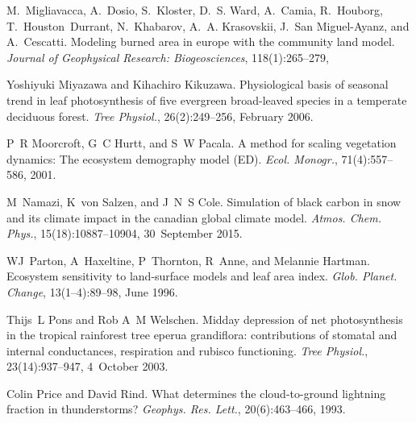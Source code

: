 \begin{DoxyDescription}
\item[\label{_CITEREF_Migliavacca2013-eh}%
\mbox{[}40\mbox{]}]M.~Migliavacca, A.~Dosio, S.~Kloster, D.~S. Ward, A.~Camia, R.~Houborg, T.~Houston~Durrant, N.~Khabarov, A.~A. Krasovskii, J.~San Miguel-\/\+Ayanz, and A.~Cescatti. Modeling burned area in europe with the community land model. {\itshape Journal of Geophysical Research\+: Biogeosciences}, 118(1)\+:265--279,
\begin{DoxyEnumerate}
\item 
\end{DoxyEnumerate}


\item[\label{_CITEREF_Miyazawa2006-so}%
\mbox{[}41\mbox{]}]Yoshiyuki Miyazawa and Kihachiro Kikuzawa. Physiological basis of seasonal trend in leaf photosynthesis of five evergreen broad-\/leaved species in a temperate deciduous forest. {\itshape Tree Physiol.}, 26(2)\+:249--256, February 2006.


\item[\label{_CITEREF_Moorcroft2001-co}%
\mbox{[}42\mbox{]}]P~R Moorcroft, G~C Hurtt, and S~W Pacala. A method for scaling vegetation dynamics\+: The ecosystem demography model (E\+D). {\itshape Ecol. Monogr.}, 71(4)\+:557--586, 2001. 


\item[\label{_CITEREF_Namazi2015-wz}%
\mbox{[}43\mbox{]}]M~Namazi, K~von Salzen, and J~N~S Cole. Simulation of black carbon in snow and its climate impact in the canadian global climate model. {\itshape Atmos. Chem. Phys.}, 15(18)\+:10887--10904, 30~September 2015. 


\item[\label{_CITEREF_Parton1996-zv}%
\mbox{[}44\mbox{]}]W\+J~Parton, A~Haxeltine, P~Thornton, R~Anne, and Melannie Hartman. Ecosystem sensitivity to land-\/surface models and leaf area index. {\itshape Glob. Planet. Change}, 13(1–4)\+:89--98, June 1996. 


\item[\label{_CITEREF_Pons2003-f26}%
\mbox{[}45\mbox{]}]Thijs~L Pons and Rob A~M Welschen. Midday depression of net photosynthesis in the tropical rainforest tree eperua grandiflora\+: contributions of stomatal and internal conductances, respiration and rubisco functioning. {\itshape Tree Physiol.}, 23(14)\+:937--947, 4~October 2003.


\item[\label{_CITEREF_Price1993-fm}%
\mbox{[}46\mbox{]}]Colin Price and David Rind. What determines the cloud-\/to-\/ground lightning fraction in thunderstorms? {\itshape Geophys. Res. Lett.}, 20(6)\+:463--466, 1993. 



\end{DoxyDescription}
